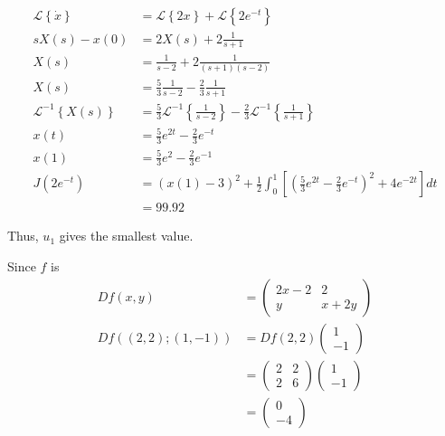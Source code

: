 \documentclass[12pt]{article}
\begin{document}
\begin{problem}[6]
\begin{enumerate}[label=(\arabic*)]
\begin{align*}
	\mathcal{L}\left\{ \dot{x}\right\} &= \mathcal{L}\left\{ 2x\right\} + \mathcal{L}\left\{ 2e^{-t}\right\}  \\
	sX(s) - x(0)&= 2 X(s) + 2 \frac{1}{s+1} \\
	X(s) &= \frac{1}{s-2} + 2 \frac{1}{(s+1)(s-2)} \\
	X(s) &= \frac{5}{3} \frac{1}{s-2} - \frac{2}{3} \frac{1}{s+1} \\
	\mathcal{L}^{-1}\left\{ X(s)\right\} &=\frac{5}{3} \mathcal{L}^{-1}\left\{ \frac{1}{s-2}\right\} - \frac{2}{3} \mathcal{L}^{-1}\left\{ \frac{1}{s+1}\right\}  \\
	x(t)&= \frac{5}{3} e^{2t} - \frac{2}{3} e^{-t} \\
	x(1) &= \frac{5}{3} e ^2 - \frac{2}{3} e^{-1} \\ 
	J(2e^{-t}) &= (x(1)-3)^2 + \frac{1}{2} \int_{ 0}^{ 1}\left[    \left( \frac{5}{3} e^{2t}-\frac{2}{3}e^{-t} \right)^2 + 4e^{-2t} \right] dt  \\
	&= 99.92 
\end{align*}
\end{enumerate}
Thus, $ u_1$ gives the smallest value.
\end{problem}

\begin{problem}[7]
Since $ f$ is 
 \begin{align*}
	 Df(x,y) &= \begin{pmatrix} 2x-2&2\\y&x+2y \end{pmatrix}  \\
	 Df((2,2);(1,-1))&= Df(2,2) \begin{pmatrix} 1\\-1 \end{pmatrix}  \\
			 &= \begin{pmatrix} 2&2\\2&6 \end{pmatrix} \begin{pmatrix} 1\\-1 \end{pmatrix}  \\
			 &= \begin{pmatrix} 0\\-4 \end{pmatrix}  
\end{align*}
\end{problem}
\end{document}
